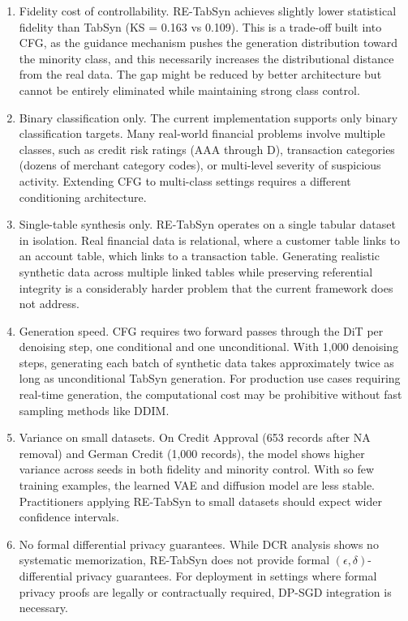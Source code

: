 \begin{enumerate}
    \item Fidelity cost of controllability. RE-TabSyn achieves slightly lower statistical fidelity than TabSyn (KS = 0.163 vs 0.109). This is a trade-off built into CFG, as the guidance mechanism pushes the generation distribution toward the minority class, and this necessarily increases the distributional distance from the real data. The gap might be reduced by better architecture but cannot be entirely eliminated while maintaining strong class control.

    \item Binary classification only. The current implementation supports only binary classification targets. Many real-world financial problems involve multiple classes, such as credit risk ratings (AAA through D), transaction categories (dozens of merchant category codes), or multi-level severity of suspicious activity. Extending CFG to multi-class settings requires a different conditioning architecture.

    \item Single-table synthesis only. RE-TabSyn operates on a single tabular dataset in isolation. Real financial data is relational, where a customer table links to an account table, which links to a transaction table. Generating realistic synthetic data across multiple linked tables while preserving referential integrity is a considerably harder problem that the current framework does not address.

    \item Generation speed. CFG requires two forward passes through the DiT per denoising step, one conditional and one unconditional. With 1,000 denoising steps, generating each batch of synthetic data takes approximately twice as long as unconditional TabSyn generation. For production use cases requiring real-time generation, the computational cost may be prohibitive without fast sampling methods like DDIM.

    \item Variance on small datasets. On Credit Approval (653 records after NA removal) and German Credit (1,000 records), the model shows higher variance across seeds in both fidelity and minority control. With so few training examples, the learned VAE and diffusion model are less stable. Practitioners applying RE-TabSyn to small datasets should expect wider confidence intervals.

    \item No formal differential privacy guarantees. While DCR analysis shows no systematic memorization, RE-TabSyn does not provide formal $(\epsilon, \delta)$-differential privacy guarantees. For deployment in settings where formal privacy proofs are legally or contractually required, DP-SGD integration is necessary.
\end{enumerate}

